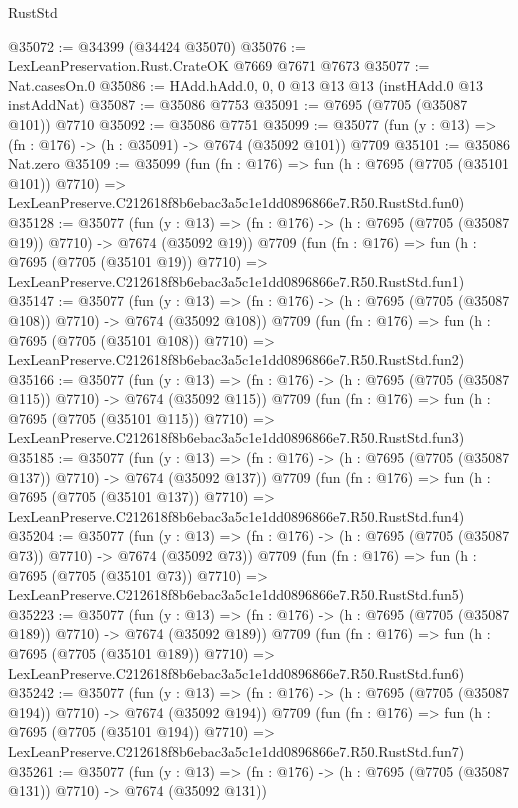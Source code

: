\begin{lexlean}{RustStd}
\begin{coremodule}
@35072 := @34399 (@34424 @35070)
@35076 := LexLeanPreservation.Rust.CrateOK @7669 @7671 @7673
@35077 := Nat.casesOn.{0}
@35086 := HAdd.hAdd.{0, 0, 0} @13 @13 @13 (instHAdd.{0} @13 instAddNat)
@35087 := @35086 @7753
@35091 := @7695 (@7705 (@35087 @101)) @7710
@35092 := @35086 @7751
@35099 := @35077 (fun (y : @13) => (fn : @176) -> (h : @35091) -> @7674 (@35092 @101)) @7709
@35101 := @35086 Nat.zero
@35109 := @35099
    (fun (fn : @176) =>
    fun (h : @7695 (@7705 (@35101 @101)) @7710) =>
    LexLeanPreserve.C212618f8b6ebac3a5c1e1dd0896866e7.R50.RustStd.fun0)
@35128 := @35077
    (fun (y : @13) => (fn : @176) -> (h : @7695 (@7705 (@35087 @19)) @7710) -> @7674 (@35092 @19))
    @7709
    (fun (fn : @176) =>
    fun (h : @7695 (@7705 (@35101 @19)) @7710) =>
    LexLeanPreserve.C212618f8b6ebac3a5c1e1dd0896866e7.R50.RustStd.fun1)
@35147 := @35077
    (fun (y : @13) => (fn : @176) -> (h : @7695 (@7705 (@35087 @108)) @7710) -> @7674 (@35092 @108))
    @7709
    (fun (fn : @176) =>
    fun (h : @7695 (@7705 (@35101 @108)) @7710) =>
    LexLeanPreserve.C212618f8b6ebac3a5c1e1dd0896866e7.R50.RustStd.fun2)
@35166 := @35077
    (fun (y : @13) => (fn : @176) -> (h : @7695 (@7705 (@35087 @115)) @7710) -> @7674 (@35092 @115))
    @7709
    (fun (fn : @176) =>
    fun (h : @7695 (@7705 (@35101 @115)) @7710) =>
    LexLeanPreserve.C212618f8b6ebac3a5c1e1dd0896866e7.R50.RustStd.fun3)
@35185 := @35077
    (fun (y : @13) => (fn : @176) -> (h : @7695 (@7705 (@35087 @137)) @7710) -> @7674 (@35092 @137))
    @7709
    (fun (fn : @176) =>
    fun (h : @7695 (@7705 (@35101 @137)) @7710) =>
    LexLeanPreserve.C212618f8b6ebac3a5c1e1dd0896866e7.R50.RustStd.fun4)
@35204 := @35077
    (fun (y : @13) => (fn : @176) -> (h : @7695 (@7705 (@35087 @73)) @7710) -> @7674 (@35092 @73))
    @7709
    (fun (fn : @176) =>
    fun (h : @7695 (@7705 (@35101 @73)) @7710) =>
    LexLeanPreserve.C212618f8b6ebac3a5c1e1dd0896866e7.R50.RustStd.fun5)
@35223 := @35077
    (fun (y : @13) => (fn : @176) -> (h : @7695 (@7705 (@35087 @189)) @7710) -> @7674 (@35092 @189))
    @7709
    (fun (fn : @176) =>
    fun (h : @7695 (@7705 (@35101 @189)) @7710) =>
    LexLeanPreserve.C212618f8b6ebac3a5c1e1dd0896866e7.R50.RustStd.fun6)
@35242 := @35077
    (fun (y : @13) => (fn : @176) -> (h : @7695 (@7705 (@35087 @194)) @7710) -> @7674 (@35092 @194))
    @7709
    (fun (fn : @176) =>
    fun (h : @7695 (@7705 (@35101 @194)) @7710) =>
    LexLeanPreserve.C212618f8b6ebac3a5c1e1dd0896866e7.R50.RustStd.fun7)
@35261 := @35077
    (fun (y : @13) => (fn : @176) -> (h : @7695 (@7705 (@35087 @131)) @7710) -> @7674 (@35092 @131))

\end{coremodule}
\end{lexlean}
